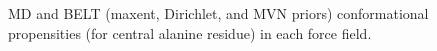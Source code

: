 \documentclass[12pt]{article}
\begin{document}
\begin{figure}

\begin{center}


\caption{
MD and BELT (maxent, Dirichlet, and MVN priors) conformational propensities (for central alanine residue) in each force field.  
}

\end{center}

\end{figure}
\end{document}
